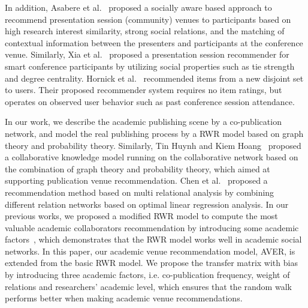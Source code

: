 \documentclass[9pt]{acm_proc_article-sp}
\begin{document}
In addition, Asabere et al.~\cite{asabere2014improving} proposed a socially aware based approach to recommend presentation session (community) venues to participants based on high research interest similarity, strong social relations, and the matching of contextual information between the presenters and participants at the conference venue. Similarly, Xia et al.~\cite{xia2013socially} proposed a presentation session recommender for smart conference participants by utilizing social properties such as tie strength and degree centrality. Hornick et al.~\cite{hornick2012extending} recommended items from a new disjoint set to users. Their proposed recommender system requires no item ratings, but operates on observed user behavior such as past conference session attendance.

In our work, we describe the academic publishing scene by a co-publication network, and model the real publishing process by a RWR model based on graph theory and probability theory. Similarly, Tin Huynh and Kiem Hoang~\cite{huynh2012modeling} proposed a collaborative knowledge model running on the collaborative network based on the combination of graph theory and probability theory, which aimed at supporting publication venue recommendation. Chen et al.~\cite{chen2012social} proposed a recommendation method based on multi relational analysis by combining different relation networks based on optimal linear regression analysis. In our previous works, we proposed a modified RWR model to compute the most valuable academic collaborators recommendation by introducing some academic factors~\cite{xia2014mvcwalker}, which demonstrates that the RWR model works well in academic social networks. In this paper, our academic venue recommendation model, AVER, is extended from the basic RWR model. We propose the transfer matrix with bias by introducing three academic factors, i.e. co-publication frequency, weight of relations and researchers' academic level, which ensures that the random walk performs better when making academic venue recommendations.
\end{document}
